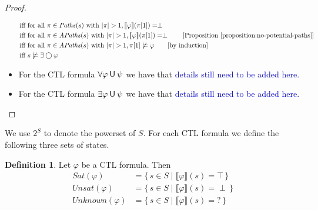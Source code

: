 \documentclass[12pt]{article}
\newcommand{\nxt}{\bigcirc}
\newcommand{\until}{\mathbin{\sf U}}
\theoremstyle{definition}
\newtheorem{definition}{Definition}
\newcommand{\comment}[1]{\hspace{2em}[\mbox{#1}]}
\newcommand{\satisfaction}[1]{\llbracket #1 \rrbracket}
\begin{document}
\begin{proof}
\begin{itemize}
\begin{align*}
\mbox{iff } & \mbox{for all } \pi \in \mathit{Paths}(s) \mbox{ with } |\pi| > 1, \satisfaction{\varphi}(\pi[1]) = \perp\\
\mbox{iff } & \mbox{for all } \pi \in \mathit{APaths}(s) \mbox{ with } |\pi| > 1, \satisfaction{\varphi}(\pi[1]) = \perp
\comment{Proposition~\ref{proposition:no-potential-paths}}\\
\mbox{iff } & \mbox{for all } \pi \in \mathit{APaths}(s) \mbox{ with } |\pi| > 1, \pi[1] \not\models \varphi
\comment{by induction}\\
\mbox{iff } & s \not\models \exists \nxt \varphi
\end{align*}
\item
For the CTL formula $\forall \varphi \until \psi$ we have that \textcolor{blue}{details still need to be added here.}
\item
For the CTL formula $\exists \varphi \until \psi$ we have that
\textcolor{blue}{details still need to be added here.}
\end{itemize}
\end{proof}

\color{black}
We use $2^S$ to denote the powerset of $S$.  For each CTL formula we define the following three sets of states.

\begin{definition}
Let $\varphi$ be a CTL formula.  Then
\begin{align*}
\mathit{Sat}(\varphi) & = \{\, s \in S \mid \satisfaction{\varphi}(s) = \top \,\}\\
\mathit{Unsat}(\varphi) & = \{\, s \in S \mid \satisfaction{\varphi}(s) = \perp \,\}\\
\mathit{Unknown}(\varphi) & = \{\, s \in S \mid \satisfaction{\varphi}(s) = ? \,\}
\end{align*}
\end{definition}
\color{black}
\end{document}
